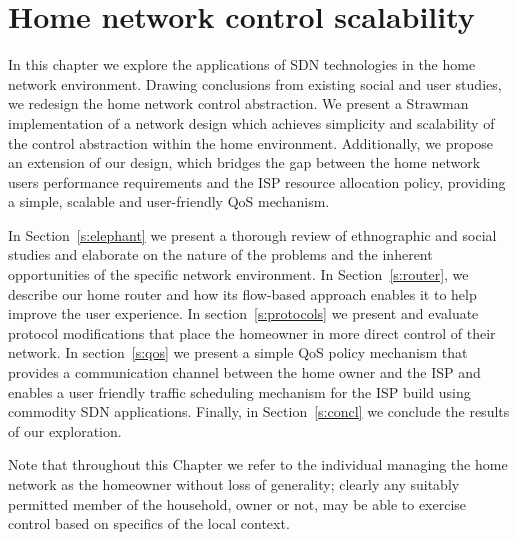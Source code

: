
\ifpdf
\graphicspath{{Chapter2/Chapter2Figs/PNG/}{Chapter2/Chapter2Figs/PDF/}{Chapter2/Chapter2Figs/}}
\else \graphicspath{{Chapter2/Chapter2Figs/EPS/}{Chapter2/Chapter2Figs/}} \fi

\chapter{Home network control scalability} 

In this chapter we explore the applications of SDN technologies in the home
network environment. Drawing conclusions from existing social and user studies,
we redesign the home network control abstraction. We present a Strawman
implementation of a network design which achieves simplicity and scalability of
the control abstraction within the home environment. Additionally, we propose an
extension of our design, which bridges the gap between the home network users
performance requirements and the ISP resource allocation policy, providing a
simple, scalable and user-friendly QoS mechanism.

In Section~\ref{s:elephant} we present a thorough review of ethnographic and
social studies and elaborate on the nature of the problems and the inherent
opportunities of the specific network environment. In Section~\ref{s:router}, we
describe our home router and how its flow-based approach enables it to help
improve the user experience. In section~\ref{s:protocols} we present and evaluate
protocol modifications that place the homeowner in more direct control of their
network. In section~\ref{s:qos} we present a simple QoS policy mechanism that
provides a communication channel between the home owner and the ISP and enables
a user friendly traffic scheduling mechanism for the ISP build using commodity
SDN applications. Finally, in Section~\ref{s:concl} we conclude the results of
our exploration.

Note that throughout this Chapter we refer to the individual managing the home
network as the homeowner without loss of generality; clearly any suitably
permitted member of the household, owner or not, may be able to exercise control
based on specifics of the local context. 


